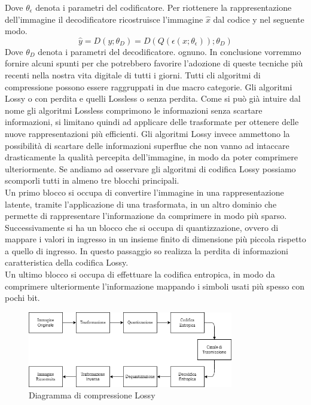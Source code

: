 Dove $\theta_{\epsilon}$ denota i parametri del codificatore.
\newpage
Per riottenere la rappresentazione dell’immagine il decodificatore ricostruisce l’immagine $\hat{x}$ dal codice y nel seguente modo.\\
\begin{equation}\label{eq:eqDecodificatore}
    \hat{y} = D(y;\theta_{D}) = D(Q(\epsilon (x;\theta_{\epsilon}));\theta_{D})
\end{equation}
Dove $\theta_{D}$ denota i parametri del decodificatore. \cite{hu2021learning}
ognuno. In conclusione vorremmo fornire alcuni spunti per che potrebbero favorire l’adozione di queste tecniche più recenti nella nostra vita digitale di tutti i giorni.
Tutti cli algoritmi di compressione possono essere raggruppati in due macro categorie. Gli algoritmi Lossy o con perdita e quelli Lossless o senza perdita. Come si può già intuire dal nome gli algoritmi Lossless comprimono le informazioni senza scartare informazioni, si limitano quindi ad applicare delle trasformate per ottenere delle nuove rappresentazioni più efficienti. Gli algoritmi Lossy invece ammettono la possibilità di scartare delle informazioni superflue che non vanno ad intaccare drasticamente la qualità percepita dell’immagine, in modo da poter comprimere ulteriormente.
Se andiamo ad osservare gli algoritmi di codifica Lossy possiamo scomporli tutti in almeno tre blocchi principali. \cite{sadeeq2021image} \\
Un primo blocco si occupa di convertire l’immagine in una rappresentazione latente, tramite l’applicazione di una trasformata, in un altro dominio che permette di rappresentare l’informazione da comprimere in modo più sparso.\\
Successivamente si ha un blocco che si occupa di quantizzazione, ovvero di mappare i valori in ingresso in un insieme finito di dimensione più piccola rispetto a quello di ingresso. In questo passaggio so realizza la perdita di informazioni caratteristica della codifica Lossy.\\
Un ultimo blocco si occupa di effettuare la codifica entropica, in modo da comprimere ulteriormente l’informazione mappando i simboli usati più spesso con pochi bit.\\
\begin{figure}[ht]
    \centering
    \includegraphics[width=0.8\textwidth]{Immagini/LossyCompressorDiagram.png}
    \caption{Diagramma di compressione Lossy}
    \label{fig:LossyCompressorDiagram}
\end{figure}
 

